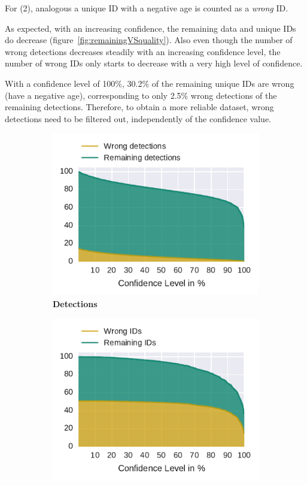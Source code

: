 For (2), analogous a unique ID with a negative age is counted as a \emph{wrong} ID.

As expected, with an increasing confidence, the remaining data and unique IDs do decrease (figure~\ref{fig:remainingVSquality}). Also even though the number of wrong detections decreases steadily with an increasing confidence level, the number of wrong IDs only starts to decrease with a very high level of confidence.

With a confidence level of 100\%, 30.2\% of the remaining unique IDs are wrong (have a negative age), corresponding to only 2.5\% wrong detections of the remaining detections. Therefore, to obtain a more reliable dataset, wrong detections need to be filtered out, independently of the confidence value.

\begin{figure}
    \centering
    \begin{subfigure}[b]{0.45\textwidth}
        \includegraphics[width=\textwidth]{Figures/detectionsWrongConf}
        \caption[Detections]{ \textbf{Detections}}
        \label{fig:detections}
    \end{subfigure}
    \begin{subfigure}[b]{0.45\textwidth}
        \includegraphics[width=\textwidth]{Figures/idsWrongConf}

\end{subfigure}
\end{figure}
